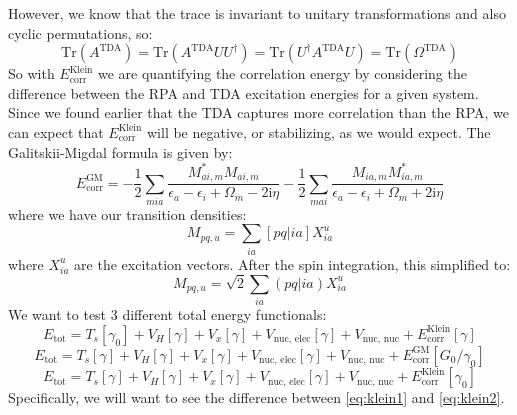 \documentclass[12pt]{article}
\begin{document}
However, we know that the trace is invariant to unitary transformations and also cyclic permutations, so:
\begin{equation}
    \text{Tr} (A^{\text{TDA}}) = \text{Tr} (A^{\text{TDA}} UU^{\dagger}) = \text{Tr} (U^{\dagger} A^{\text{TDA}} U) = \text{Tr} (\Omega ^{\text{TDA}})
\end{equation}
So with $E_{\text{corr}}^{\text{Klein}}$ we are quantifying the correlation energy by considering the difference between the RPA and TDA excitation energies for a given system. Since we found earlier that the TDA captures more correlation than the RPA, we can expect that $E_{\text{corr}}^{\text{Klein}}$ will be negative, or stabilizing, as we would expect.
The Galitskii-Migdal formula is given by:
\begin{equation}
    E_{\text{corr}} ^{\text{GM}} =-\frac{1}{2} \sum_{m i a} \frac{M_{a i, m}^* M_{a i, m}}{\epsilon_a-\epsilon_i+\Omega_m-2 \mathrm{i} \eta}-\frac{1}{2} \sum_{m a i} \frac{M_{i a, m} M_{i a, m}^*}{\epsilon_a-\epsilon_i+\Omega_m+2 \mathrm{i} \eta}
\end{equation}
where we have our transition densities:
\begin{equation}
    M_{pq,u} = \sum_{ia} [pq|ia] X_{ia}^u
\end{equation}
where $X_{ia}^u$ are the excitation vectors. After the spin integration, this simplified to:
\begin{equation}
    M_{pq,u} = \sqrt{2} \sum_{ia} (pq|ia) X_{ia}^u
\end{equation}
We want to test 3 different total energy functionals:
\begin{equation}
    E_{\text{tot}} = T_s [\gamma _{0}] + V_H [\gamma ] + V_x [\gamma ] + V_{\text{nuc, elec}} [\gamma ] + V_{\text{nuc, nuc}} + E_{\text{corr}} ^{\text{Klein}}[\gamma ]
\label{eq:klein1}
\end{equation}
\begin{equation}
    E_{\text{tot}} = T_s [\gamma ] + V_H [\gamma ] + V_x [\gamma ] + V_{\text{nuc, elec}} [\gamma ] + V_{\text{nuc, nuc}} + E_{\text{corr}} ^{\text{GM}}[G_0/\gamma _0]
\end{equation}
\begin{equation}
    E_{\text{tot}} = T_s [\gamma ] + V_H [\gamma ] + V_x [\gamma ] + V_{\text{nuc, elec}} [\gamma ] + V_{\text{nuc, nuc}} + E_{\text{corr}} ^{\text{Klein}}[\gamma_0]
\label{eq:klein2}
\end{equation}
Specifically, we will want to see the difference between \ref{eq:klein1} and \ref{eq:klein2}. 
\end{document}
